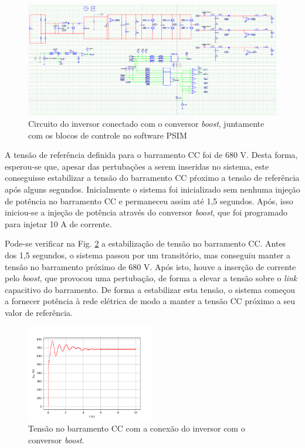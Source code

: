 \begin{figure}[!hbt]
	\begin{center}
    \includegraphics[width=\textwidth]{figuras/sim_figures/inversor_e_boost/esquematico.PNG}\centering
    \caption{Circuito do inversor conectado com o conversor \textit{boost}, juntamente com os blocos de controle no software PSIM}
    \label{fig:sim-circuito-inversor-boost}
    \end{center}
\end{figure}

A tensão de referência definida para o barramento CC foi de 680 V. Desta forma, esperou-se que, apesar das pertubações a serem inseridas no sistema, este conseguisse estabilizar a tensão do barramento CC pŕoximo a tensão de referência após alguns segundos.
Inicialmente o sistema foi inicializado sem nenhuma injeção de potência no barramento CC e permaneceu assim até 1,5 segundos. Após, isso iniciou-se a injeção de potência através do conversor \textit{boost}, que foi programado para injetar 10 A de corrente.

Pode-se verificar na Fig. \ref{fig:sim-tensao-barramento} a estabilização de tensão no barramento CC. 
Antes dos 1,5 segundos, o sistema passou por um transitório, mas conseguiu manter a tensão no barramento próximo de 680 V. 
Após isto, houve a inserção de corrente pelo \textit{boost}, que provocou uma pertubação, de forma a elevar a tensão sobre o \textit{link} capacitivo do barramento.
De forma a estabilizar esta tensão, o sistema começou a fornecer potência à rede elétrica de modo a manter a tensão CC próximo a seu valor de referência.

\begin{figure}[!hbt]
	\begin{center}
    \includegraphics[width=0.5\textwidth]{figuras/sim_figures/inversor_e_boost/tensao_barramento.png}
    \caption{Tensão no barramento CC com a conexão do inversor com o conversor \textit{boost}.}
    \label{fig:sim-tensao-barramento}
    \end{center}
\end{figure}

